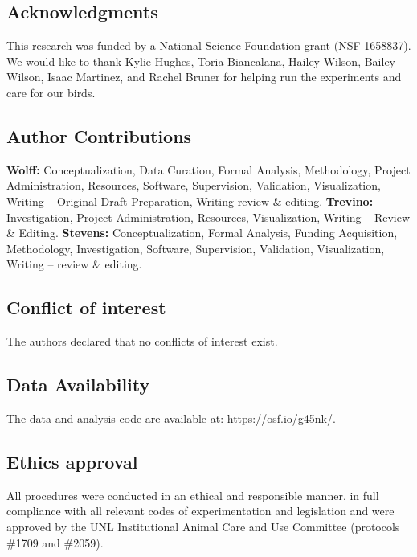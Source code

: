 \documentclass[
  ,doc,floatsintext]{apa6}
\begin{document}
\hypertarget{acknowledgments}{%
\subsection{Acknowledgments}\label{acknowledgments}}

This research was funded by a National Science Foundation grant (NSF-1658837). We would like to thank Kylie Hughes, Toria Biancalana, Hailey Wilson, Bailey Wilson, Isaac Martinez, and Rachel Bruner for helping run the experiments and care for our birds.

\hypertarget{author-contributions}{%
\subsection{Author Contributions}\label{author-contributions}}

\textbf{Wolff:} Conceptualization, Data Curation, Formal Analysis, Methodology, Project Administration, Resources, Software, Supervision, Validation, Visualization, Writing -- Original Draft Preparation, Writing-review \& editing. \textbf{Trevino:} Investigation, Project Administration, Resources, Visualization, Writing -- Review \& Editing. \textbf{Stevens:} Conceptualization, Formal Analysis, Funding Acquisition, Methodology, Investigation, Software, Supervision, Validation, Visualization, Writing -- review \& editing.

\hypertarget{conflict-of-interest}{%
\subsection{Conflict of interest}\label{conflict-of-interest}}

The authors declared that no conflicts of interest exist.

\hypertarget{data-availability}{%
\subsection{Data Availability}\label{data-availability}}

The data and analysis code are available at: \url{https://osf.io/g45nk/}.

\hypertarget{ethics-approval}{%
\subsection{Ethics approval}\label{ethics-approval}}

All procedures were conducted in an ethical and responsible manner, in full compliance with all relevant codes of experimentation and legislation and were approved by the UNL Institutional Animal Care and Use Committee (protocols \#1709 and \#2059).
\end{document}
